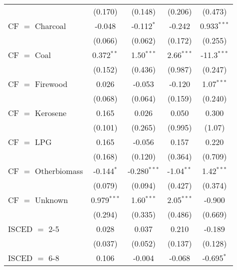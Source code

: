 \begin{table}[htbp!]
\begin{adjustbox}{width = 1\textwidth, max height = 0.95\textheight, center}
\begin{threeparttable}[b]
\begin{tabular}{lcccc}
                                 & (0.170)            & (0.148)            & (0.206)       & (0.473)\\   
            CF $=$ Charcoal      & -0.048             & -0.112$^{*}$       & -0.242        & 0.933$^{***}$\\   
                                 & (0.066)            & (0.062)            & (0.172)       & (0.255)\\   
            CF $=$ Coal          & 0.372$^{**}$       & 1.50$^{***}$       & 2.66$^{***}$  & -11.3$^{***}$\\   
                                 & (0.152)            & (0.436)            & (0.987)       & (0.247)\\   
            CF $=$ Firewood      & 0.026              & -0.053             & -0.120        & 1.07$^{***}$\\   
                                 & (0.068)            & (0.064)            & (0.159)       & (0.240)\\   
            CF $=$ Kerosene      & 0.165              & 0.026              & 0.050         & 0.300\\   
                                 & (0.101)            & (0.265)            & (0.995)       & (1.07)\\   
            CF $=$ LPG           & 0.165              & -0.056             & 0.157         & 0.220\\   
                                 & (0.168)            & (0.120)            & (0.364)       & (0.709)\\   
            CF $=$ Otherbiomass  & -0.144$^{*}$       & -0.280$^{***}$     & -1.04$^{**}$  & 1.42$^{***}$\\   
                                 & (0.079)            & (0.094)            & (0.427)       & (0.374)\\   
            CF $=$ Unknown       & 0.979$^{***}$      & 1.60$^{***}$       & 2.05$^{***}$  & -0.900\\   
                                 & (0.294)            & (0.335)            & (0.486)       & (0.669)\\   
            ISCED $=$ 2-5        & 0.028              & 0.037              & 0.210         & -0.189\\   
                                 & (0.037)            & (0.052)            & (0.137)       & (0.128)\\   
            ISCED $=$ 6-8        & 0.106              & -0.004             & -0.068        & -0.695$^{*}$\\   

\end{tabular}
\end{threeparttable}
\end{adjustbox}
\end{table}
